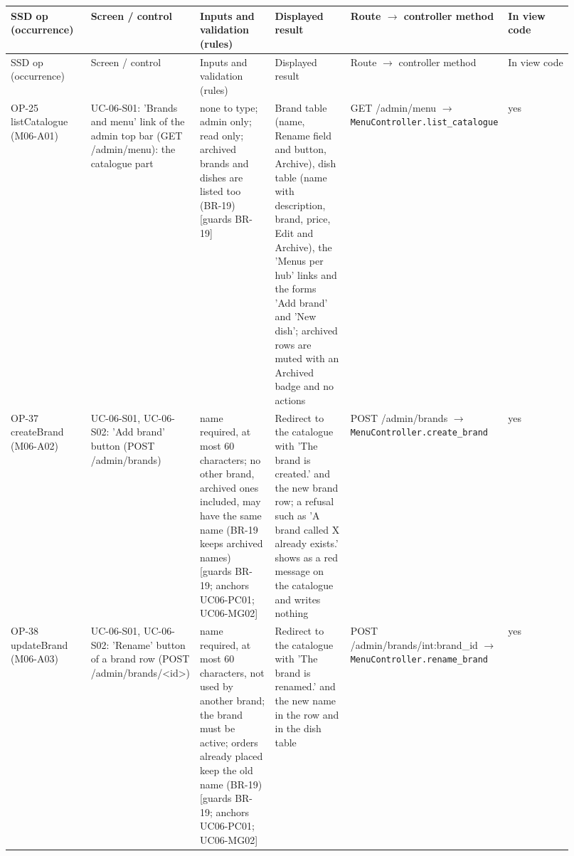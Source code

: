 \begingroup\footnotesize
\begin{longtable}{>{\raggedright\arraybackslash}p{0.1533\linewidth}>{\raggedright\arraybackslash}p{0.1533\linewidth}>{\raggedright\arraybackslash}p{0.1533\linewidth}>{\raggedright\arraybackslash}p{0.1533\linewidth}>{\raggedright\arraybackslash}p{0.1533\linewidth}>{\raggedright\arraybackslash}p{0.1533\linewidth}}
SSD op (occurrence) & Screen / control & Inputs and validation (rules) & Displayed result & Route \ensuremath{\rightarrow} controller method & In view code \\
\hline\endfirsthead
SSD op (occurrence) & Screen / control & Inputs and validation (rules) & Displayed result & Route \ensuremath{\rightarrow} controller method & In view code \\
\hline\endhead
OP-25 listCatalogue (M06-A01) & UC-06-S01: 'Brands and menu' link of the admin top bar (GET /admin/menu): the catalogue part & none to type; admin only; read only; archived brands and dishes are listed too (BR-19) [guards BR-19] & Brand table (name, Rename field and button, Archive), dish table (name with description, brand, price, Edit and Archive), the 'Menus per hub' links and the forms 'Add brand' and 'New dish'; archived rows are muted with an Archived badge and no actions & GET /admin/menu \ensuremath{\rightarrow} \texttt{MenuController.\allowbreak{}list\_\allowbreak{}catalogue} & yes \\
OP-37 createBrand (M06-A02) & UC-06-S01, UC-06-S02: 'Add brand' button (POST /admin/brands) & name required, at most 60 characters; no other brand, archived ones included, may have the same name (BR-19 keeps archived names) [guards BR-19; anchors UC06-PC01; UC06-MG02] & Redirect to the catalogue with 'The brand is created.' and the new brand row; a refusal such as 'A brand called X already exists.' shows as a red message on the catalogue and writes nothing & POST /admin/brands \ensuremath{\rightarrow} \texttt{MenuController.\allowbreak{}create\_\allowbreak{}brand} & yes \\
OP-38 updateBrand (M06-A03) & UC-06-S01, UC-06-S02: 'Rename' button of a brand row (POST /admin/brands/\textless{}id\textgreater{}) & name required, at most 60 characters, not used by another brand; the brand must be active; orders already placed keep the old name (BR-19) [guards BR-19; anchors UC06-PC01; UC06-MG02] & Redirect to the catalogue with 'The brand is renamed.' and the new name in the row and in the dish table & POST /admin/brands/int:brand\_id \ensuremath{\rightarrow} \texttt{MenuController.\allowbreak{}rename\_\allowbreak{}brand} & yes \\

\end{longtable}
